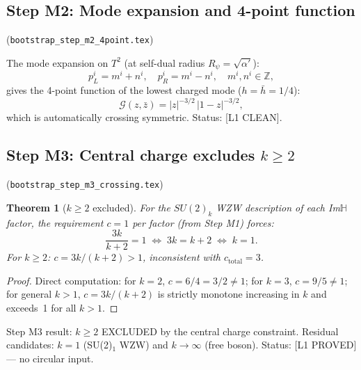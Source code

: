 \documentclass[12pt,a4paper]{article}
\newtheorem{theorem}{Theorem}[section]
\theoremstyle{definition}
\theoremstyle{remark}
\begin{document}
\subsection*{Step M2: Mode expansion and 4-point function}
(\texttt{bootstrap\_step\_m2\_4point.tex})

\begin{resultbox}
The mode expansion on $T^2$ (at self-dual radius $R_\psi = \sqrt{\alpha'}$):
\begin{equation}
  p^i_L = m^i + n^i, \quad p^i_R = m^i - n^i,
  \quad m^i, n^i \in \mathbb{Z},
  \label{eq:g3k:momenta}
\end{equation}
gives the 4-point function of the lowest charged mode ($h = \bar{h} = 1/4$):
\begin{equation}
  \mathcal{G}(z,\bar{z})
  = |z|^{-3/2}\,|1-z|^{-3/2},
  \label{eq:g3k:G4}
\end{equation}
which is automatically crossing symmetric.
Status: [L1 CLEAN].
\end{resultbox}

\subsection*{Step M3: Central charge excludes $k \geq 2$}
(\texttt{bootstrap\_step\_m3\_crossing.tex})

\begin{theorem}[$k \geq 2$ excluded]
\label{thm:g3k:k2_excluded}
For the $SU(2)_k$ WZW description of each Im$\mathbb{H}$ factor, the
requirement $c = 1$ per factor (from Step M1) forces:
\begin{equation}
  \frac{3k}{k+2} = 1
  \;\Longleftrightarrow\; 3k = k+2
  \;\Longleftrightarrow\; k = 1.
  \label{eq:g3k:c_constraint}
\end{equation}
For $k \geq 2$: $c = 3k/(k+2) > 1$, inconsistent with $c_{\mathrm{total}} = 3$.
\end{theorem}

\begin{proof}
Direct computation: for $k = 2$, $c = 6/4 = 3/2 \neq 1$;
for $k = 3$, $c = 9/5 \neq 1$; for general $k > 1$, $c = 3k/(k+2)$ is strictly
monotone increasing in $k$ and exceeds~1 for all $k > 1$.
\end{proof}

\begin{resultbox}
Step M3 result: $k \geq 2$ EXCLUDED by the central charge constraint.
Residual candidates: $k = 1$ (SU(2)$_1$ WZW) and $k\to\infty$ (free boson).
Status: [L1 PROVED] — no circular input.
\end{resultbox}
\end{document}
